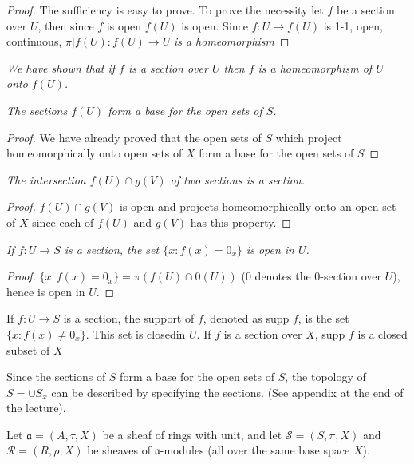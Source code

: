 \begin{proof}
The sufficiency is easy to prove. To prove the necessity let $f$ be a
section over $U$, then since $f$ is open $f(U)$ is open. Since $f: U
\to f(U)$ is 1-1, open, continuous, $\pi|f(U):f(U) \to U$ \textit{is
  a homeomorphism} 
\end{proof}

\textit{We have shown that if $f$ is a section over $U$ then $f$ is a 
  homeomorphism of $U$ onto $f(U)$.} 

\textit{The sections $f(U)$ form a base for the open sets of $S$.} 

\begin{proof}
We have already proved that the open sets of $S$ which project
homeomorphically onto open sets of $X$ form a base for the open sets
of $S$ 
\end{proof}

\textit{The intersection $f(U) \cap g(V)$ of two sections is a
  section.}

\begin{proof}
$f(U) \cap g(V)$ is open and projects homeomorphically onto an open
  set of $X$ since each of $f(U)$ and $g(V)$ has this property. 
\end{proof}

\textit{If $f:U \to S$ is a section, the set $\{ x : f(x) = 0_x \}$  
  is open in $U$.}  

\begin{proof}
$\{ x : f(x) = 0_x \}= \pi (f(U) \cap 0(U))$ (0 denotes the 0-section
  over $U$), hence is open in $U$. 
\end{proof}

\begin{defi*}
If $f:U \to S$ is a section, the support of $f$, denoted as supp $f$,
is the set $\{ x : f(x) \neq  0_x \}$. This set is
closed\pageoriginale in $U$. If 
$f$ is a section over $X$, supp $f$ is a closed subset of $X$ 
\end{defi*}

\begin{note*}
Since the sections of $S$ form a base for the open sets
of $S$, the topology of $S= \cup S_x$ can be described by specifying
the sections. (See appendix at the end of the lecture). 
\end{note*}

Let $\mathfrak{a}=(A, \tau,X)$ be a sheaf of rings with unit, and let
$\mathscr{S}=(S, \pi ,X)$ and $\mathscr{R}= (R, \rho ,X)$ be sheaves
of $\mathfrak{a}$-modules (all over the same base space $X$). 

